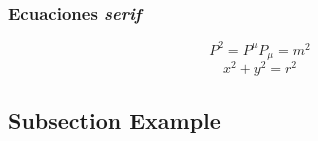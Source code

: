 \documentclass[aspectratio=169]{beamer}
\begin{document}
\begin{frame}
	\frametitle{Ecuaciones {\it serif}}
	\begin{equation}
		P^2=P^{\mu}P_{\mu}=m^2
	\end{equation}
	\begin{equation}
		x^2 + y^2 = r^2
	\end{equation}
\end{frame}

\subsection{Subsection Example} %
\end{document}
